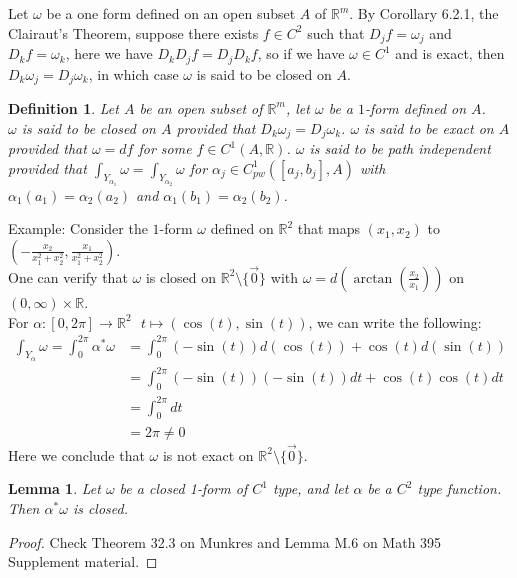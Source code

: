 \documentclass[15pt]{book}
\theoremstyle{break}
\theoremstyle{break}
\newtheorem{lem}{Lemma}[thm]
\newtheorem{defn}{Definition}[corL]
\newcommand{\R}{\mathbb{R}}
\newcommand{\example}{\color{green}Example: \color{black}}
\begin{document}
Let $\omega$ be a one form defined on an open subset $A$ of $\R^m$. By Corollary 6.2.1, the Clairaut's Theorem, suppose there exists $f \in C^2$ such that $D_jf = \omega_j$ and $D_kf = \omega_k$, here we have $D_kD_jf = D_jD_kf$, so if we have $\omega \in C^1$ and is exact, then $D_k\omega_j = D_j \omega_k$, in which case $\omega$ is said to be closed on $A$. 

\begin{defn}
Let $A$ be an open subset of $\R^m$, let $\omega$ be a $1$-form defined on $A$.\\
$\omega$ is said to be closed on $A$ provided that $D_k\omega_j = D_j \omega_k$. 
$\omega$ is said to be exact on $A$ provided that $\omega = df$ for some $f \in C^1(A,\R)$. $\omega$ is said to be path independent provided that $\int_{Y_{\alpha_1}} \omega = \int_{Y_{\alpha_2}}\omega$ for $\alpha_j \in C_{pw}^1([a_j,b_j],A)$ with $\alpha_1(a_1) = \alpha_2(a_2)$ and $\alpha_1(b_1) = \alpha_2(b_2)$. 
\end{defn}

\example Consider the $1$-form $\omega $ defined on $\R^2$ that maps $(x_1,x_2)$ to $(-\frac{x_2}{x_1^2+x_2^2} , \frac{x_1}{x_1^2+x_2^2})$.\\
One can verify that $\omega$ is closed on $\R^2 \setminus \{\vec{0}\}$ with $\omega = d(\arctan(\frac{x_2}{x_1}))$ on $(0,\infty) \times \R$.\\
For $\alpha:[0,2\pi] \to \R^2 \ \ \ t\mapsto (\cos(t),\sin(t))$, we can write the following:
\begin{align*}
\int_{Y_\alpha} \omega = \int_0^{2\pi} \alpha^*\omega &= \int_0^{2\pi} (-\sin(t))d(\cos(t)) + \cos(t) d(\sin(t)) \\&= \int_0^{2\pi} (-\sin(t))(-\sin(t))dt + \cos(t)\cos(t)dt \\&= \int_0^{2\pi} dt \\&= 2\pi \neq 0
\end{align*}
Here we conclude that $\omega$ is not exact on $\R^2 \setminus \{\vec{0}\}$. 
\newpage

\begin{lem}
Let $\omega$ be a closed 1-form of $C^1$ type, and let $\alpha$ be a $C^2$ type function. Then $\alpha^*\omega$ is closed. 
\end{lem}
\begin{proof}
Check Theorem 32.3 on Munkres and Lemma M.6 on Math 395 Supplement material.
\end{proof}
\end{document}
